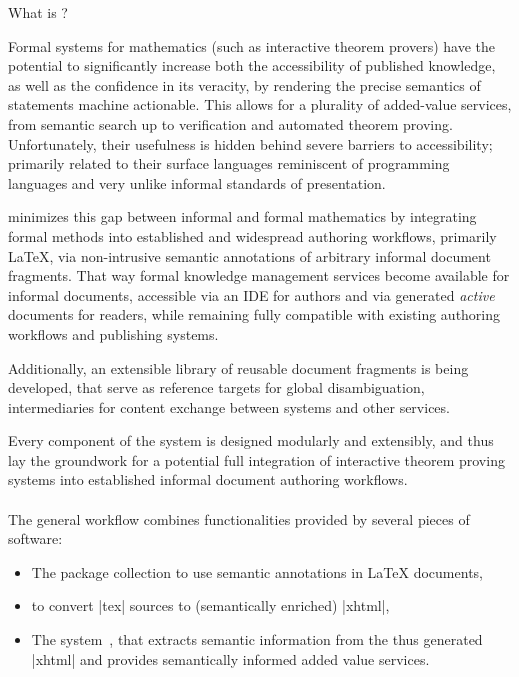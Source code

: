 \begin{sfragment}{What is \sTeX?}
  
Formal systems for mathematics (such as interactive theorem provers)
have the potential to significantly increase both the accessibility
of published knowledge, as well as the confidence in its veracity,
by rendering the precise semantics of statements machine actionable.
This allows for a plurality of added-value services, from semantic
search up to verification and automated theorem proving.
Unfortunately, their usefulness is hidden behind severe barriers
to accessibility; primarily related to their surface languages
reminiscent of programming languages and very unlike informal
standards of presentation.

\sTeX minimizes this gap between informal and formal 
mathematics by integrating formal methods into established
and widespread authoring workflows, primarily \LaTeX, via 
non-intrusive semantic
annotations of arbitrary informal document fragments. That way
formal knowledge management services become available for informal
documents, accessible via an IDE for authors and via generated
\emph{active} documents for readers, while remaining fully compatible
with existing authoring workflows and publishing systems.

Additionally, an extensible library of reusable
document fragments is being developed, that serve as reference targets
for global disambiguation, intermediaries for content exchange
between systems and other services.

Every component of the system is designed modularly and extensibly,
and thus lay the groundwork for a potential full integration of
interactive theorem proving systems into established informal document
authoring workflows.

\paragraph{} The general \sTeX workflow combines functionalities
provided by several pieces of software:
\begin{itemize}
\item The \sTeX package collection to use semantic annotations in {\LaTeX} documents,
\item \RusTeX \cite{RusTeX:on} to convert |tex| sources to (semantically enriched) |xhtml|,
\item The \mmt system~\cite{uniformal:on}, that extracts semantic information from the
  thus generated |xhtml| and provides semantically informed added value services.
\end{itemize}



\end{sfragment}
